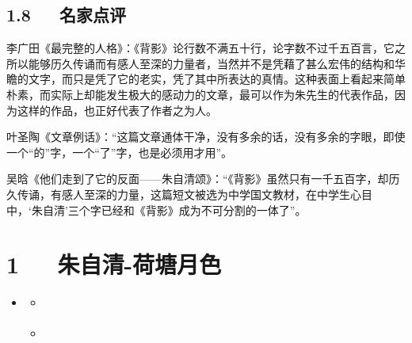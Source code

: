 \documentclass[letterpaper,12pt,english]{sphinxmanual}
\begin{document}
\section{1.8   名家点评}
\label{\detokenize{p01_u6563_u6587/_u6731_u81ea_u6e05-_u80cc_u5f71:id13}}
李广田《最完整的人格》：《背影》论行数不满五十行，论字数不过千五百言，它之所以能够历久传诵而有感人至深的力量者，当然并不是凭藉了甚么宏伟的结构和华瞻的文字，而只是凭了它的老实，凭了其中所表达的真情。这种表面上看起来简单朴素，而实际上却能发生极大的感动力的文章，最可以作为朱先生的代表作品，因为这样的作品，也正好代表了作者之为人。

叶圣陶《文章例话》：“这篇文章通体干净，没有多余的话，没有多余的字眼，即使一个“的”字，一个“了”字，也是必须用才用”。

吴晗《他们走到了它的反面——朱自清颂》：“《背影》虽然只有一千五百字，却历久传诵，有感人至深的力量，这篇短文被选为中学国文教材，在中学生心目中，‘朱自清’三个字已经和《背影》成为不可分割的一体了”。


\chapter{1   朱自清-荷塘月色}
\label{\detokenize{p01_u6563_u6587/_u6731_u81ea_u6e05-_u8377_u5858_u6708_u8272:id1}}\label{\detokenize{p01_u6563_u6587/_u6731_u81ea_u6e05-_u8377_u5858_u6708_u8272::doc}}
\begin{sphinxShadowBox}
\begin{itemize}
\item {} 
\label{\detokenize{p01_u6563_u6587/_u6731_u81ea_u6e05-_u8377_u5858_u6708_u8272:id5}}{\hyperref[\detokenize{p01_u6563_u6587/_u6731_u81ea_u6e05-_u8377_u5858_u6708_u8272:id1}]{}}
\begin{itemize}
\item {} 
\label{\detokenize{p01_u6563_u6587/_u6731_u81ea_u6e05-_u8377_u5858_u6708_u8272:id6}}{\hyperref[\detokenize{p01_u6563_u6587/_u6731_u81ea_u6e05-_u8377_u5858_u6708_u8272:id3}]{}}

\item {} 
\label{\detokenize{p01_u6563_u6587/_u6731_u81ea_u6e05-_u8377_u5858_u6708_u8272:id7}}{\hyperref[\detokenize{p01_u6563_u6587/_u6731_u81ea_u6e05-_u8377_u5858_u6708_u8272:id4}]{}}

\end{itemize}

\end{itemize}
\end{sphinxShadowBox}
\end{document}

